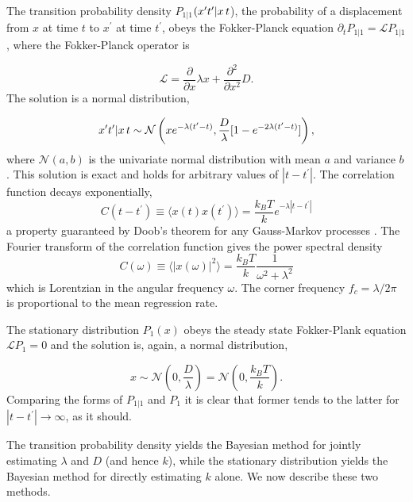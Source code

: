 \documentclass[english,aps, onecolumn, prl,superscriptaddress, notitlepage]{revtex4-1}
\begin{document}
The transition probability density $P_{1|1}$$(x^{\prime}t^{\prime}|x\thinspace t$),
the probability of a displacement from $x$ at time $t$ to $x^{\prime}$
at time $t^{\prime}$, obeys the Fokker-Planck equation $\partial_{t}P_{1|1}=\mathcal{L}P_{1|1}$,
where the Fokker-Planck operator is 

\begin{equation}
\mathcal{L}=\frac{\partial}{\partial x}\lambda x+\frac{\partial^{2}}{\partial x^{2}}D.
\end{equation}
The solution is a normal distribution, 

\begin{equation}
x^{\prime}t^{\prime}|x\thinspace t\sim\mathcal{N}\left(xe^{-\lambda(t^{\prime}-t)},\frac{D}{\lambda}[1-e^{-2\lambda(t^{\prime}-t)}]\right),
\end{equation}
where $\mathcal{N}(a,b)$ is the univariate normal distribution with
mean $a$ and variance $b$. This solution is exact and holds for
arbitrary values of $|t-t^{\prime}|$. The correlation function decays
exponentially, 
\begin{equation}
C(t-t^{\prime})\equiv\langle x(t)x(t^{\prime})\rangle=\frac{k_{B}T}{k}e^{-\lambda|t-t^{\prime}|}\label{eq:autocorr}
\end{equation}
a property guaranteed by Doob's theorem for any Gauss-Markov processes
\cite{van1992stochastic}. The Fourier transform of the correlation
function gives the power spectral density 
\begin{equation}
C(\omega)\equiv\langle|x(\omega)|^{2}\rangle=\frac{k_{B}T}{k}\frac{1}{\omega^{2}+\lambda^{2}}\label{eq:spectral-density}
\end{equation}
which is Lorentzian in the angular frequency $\omega$. The corner
frequency $f_{c}=\lambda/2\pi$ is proportional to the mean regression
rate. 

The stationary distribution $P_{1}(x)$ obeys the steady state Fokker-Plank
equation $\mathcal{L}P_{1}=0$ and the solution is, again, a normal
distribution,

\begin{equation}
x\sim\mathcal{N}\left(0,\frac{D}{\lambda}\right)=\mathcal{N}\left(0,\frac{k_{B}T}{k}\right).
\end{equation}
Comparing the forms of $P_{1|1}$ and $P_{1}$ it is clear that former
tends to the latter for $|t-t^{\prime}|\rightarrow\infty$, as it
should. 

The transition probability density yields the Bayesian method for
jointly estimating $\lambda$ and $D$ (and hence $k$), while the
stationary distribution yields the Bayesian method for directly estimating
$k$ alone. We now describe these two methods. 
\end{document}
